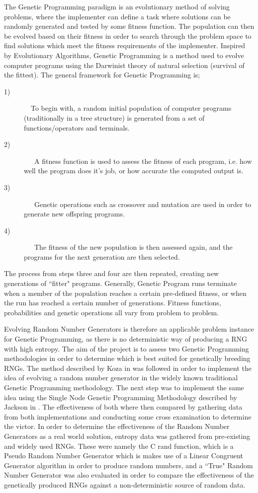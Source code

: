 \documentclass[a4paper,10.5pt]{article}
\begin{document}
The Genetic Programming paradigm is an evolutionary method of solving problems, where the implementer can define a task where solutions can be randomly generated and tested by some fitness function. The population can then be evolved based on their fitness in order to search through the problem space to find solutions which meet the fitness requirements of the implementer. 
Inspired by Evolutionary Algorithms, Genetic Programming is a method used to evolve computer programs using the Darwinist theory of natural selection (survival of the fittest). The general framework for Genetic Programming is;
\begin{description}
  \item[1)]
  \ \ To begin with, a random initial population of computer programs (traditionally in a tree structure) is generated from a set of functions/operators and terminals. 
  \item[2)]
 \ \ \ A fitness function is used to assess the fitness of each program, i.e. how well the program does it's job, or how accurate the computed output is. 
  \item[3)]
  \ \ \ Genetic operations such as crossover and mutation are used in order to generate new offspring programs.
  \item[4)]
 \ \ \ The fitness of the new population is then assessed again, and the programs for the next generation are then selected.
\end{description}
The process from steps three and four are then repeated, creating new generations of ``fitter" programs. Generally, Genetic Program runs terminate when a member of the population reaches a certain pre-defined fitness, or when the run has reached a certain number of generations. Fitness functions, probabilities and genetic operations all vary from problem to problem.

Evolving Random Number Generators is therefore an applicable problem instance for Genetic Programming, as there is no deterministic way of producing a RNG with high entropy.  The aim of the project is to assess two Genetic Programming methodologies in order to determine which is best suited for genetically breeding RNGs. The method described by Koza in \cite{kozarng} was followed in order to implement the idea of evolving a random number generator in the widely known traditional Genetic Programming methodology. The next step was to implement the same idea using the Single Node Genetic Programming Methodology described by Jackson in \cite{jacksonsngp}. The effectiveness of both where then compared by gathering data from both implementations and conducting some cross examination to determine the victor. In order to determine the effectiveness of the Random Number Generators as a real world solution, entropy data was gathered from pre-existing and widely used RNGs. These were namely the C rand function, which is a Pseudo Random Number Generator which is makes use of a Linear Congruent Generator algorithm in order to produce random numbers, and a ``True" Random Number Generator was also evaluated in order to compare the effectiveness of the genetically produced RNGs against a non-deterministic source of random data. 
\end{document}
